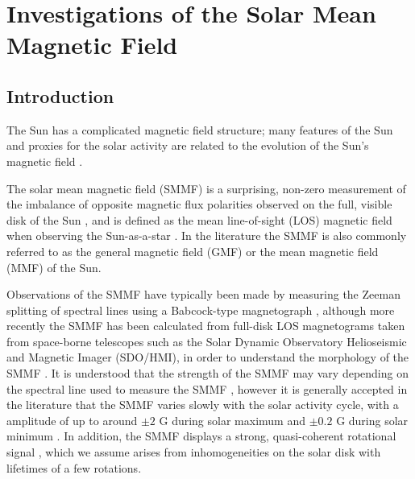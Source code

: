 \chapter{Investigations of the Solar Mean Magnetic Field}\label{chap:SMMF}

\section{Introduction}\label{sec:SMMF_intro}

The Sun has a complicated magnetic field structure; many features of the Sun and proxies for the solar activity are related to the evolution of the Sun's magnetic field \citep{wu_solar_2018}.

The solar mean magnetic field (SMMF) is a surprising, non-zero measurement of the imbalance of opposite magnetic flux polarities observed on the full, visible disk of the Sun \citep{svalgaard_suns_1975}, and is defined as the mean line-of-sight (LOS) magnetic field when observing the Sun-as-a-star \citep{scherrer_mean_1977, scherrer_mean_1977-1, garcia_integrated_1999}. In the literature the SMMF is also commonly referred to as the general magnetic field (GMF) \citep{severny_time_1971} or the mean magnetic field (MMF) \citep{kotov_mean_2008} of the Sun.

Observations of the SMMF have typically been made by measuring the Zeeman splitting of spectral lines using a Babcock-type magnetograph \citep{scherrer_mean_1977}, although more recently the SMMF has been calculated from full-disk LOS magnetograms taken from space-borne telescopes such as the Solar Dynamic Observatory Helioseismic and Magnetic Imager (SDO/HMI), in order to understand the morphology of the SMMF \citep{kutsenko_contribution_2017, bose_variability_2018}. It is understood that the strength of the SMMF may vary depending on the spectral line used to measure the SMMF \citep{kotov_mean_2008, kotov_enigmas_2012}, however it is generally accepted in the literature that the SMMF varies slowly with the solar activity cycle, with a amplitude of up to around $\pm 2$ G during solar maximum and $\pm 0.2$ G during solar minimum \citep{plachinda_general_2011}. In addition, the SMMF displays a strong, quasi-coherent rotational signal \citep{chaplin_studies_2003, xie_temporal_2017}, which we assume arises from inhomogeneities on the solar disk with lifetimes of a few rotations.

